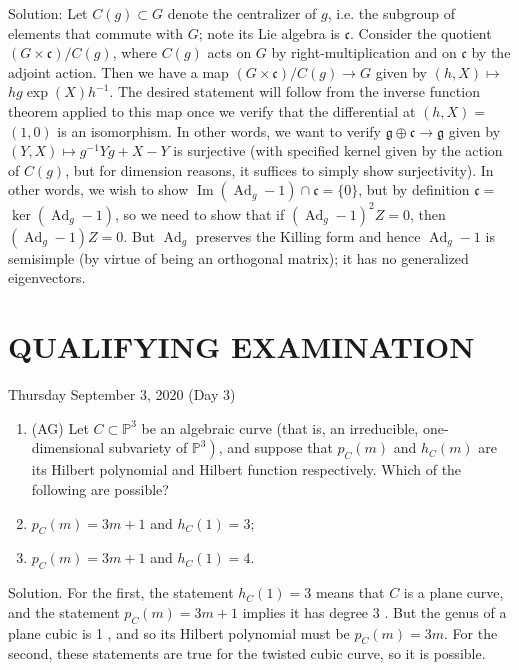 \documentclass[10pt]{article}
\begin{document}
Solution: Let $C(g) \subset G$ denote the centralizer of $g$, i.e. the subgroup of elements that commute with $G$; note its Lie algebra is $\mathfrak{c}$. Consider the quotient $(G \times \mathfrak{c}) / C(g)$, where $C(g)$ acts on $G$ by right-multiplication and on $\mathfrak{c}$ by the adjoint action. Then we have a map $(G \times \mathfrak{c}) / C(g) \rightarrow G$ given by $(h, X) \mapsto$ $h g \exp (X) h^{-1}$. The desired statement will follow from the inverse function theorem applied to this map once we verify that the differential at $(h, X)=$ $(1,0)$ is an isomorphism. In other words, we want to verify $\mathfrak{g} \oplus \mathfrak{c} \rightarrow \mathfrak{g}$ given by $(Y, X) \mapsto g^{-1} Y g+X-Y$ is surjective (with specified kernel given by the action of $C(g)$, but for dimension reasons, it suffices to simply show surjectivity). In other words, we wish to show $\operatorname{Im}\left(\operatorname{Ad}_{g}-1\right) \cap \mathfrak{c}=\{0\}$, but by definition $\mathfrak{c}=$ $\operatorname{ker}\left(\operatorname{Ad}_{g}-1\right)$, so we need to show that if $\left(\operatorname{Ad}_{g}-1\right)^{2} Z=0$, then $\left(\operatorname{Ad}_{g}-1\right) Z=0$. But $\operatorname{Ad}_{g}$ preserves the Killing form and hence $\operatorname{Ad}_{g}-1$ is semisimple (by virtue of being an orthogonal matrix); it has no generalized eigenvectors.

\section*{QUALIFYING EXAMINATION }
Thursday September 3, 2020 (Day 3)

\begin{enumerate}
  \item (AG) Let $C \subset \mathbb{P}^{3}$ be an algebraic curve (that is, an irreducible, one-dimensional subvariety of $\left.\mathbb{P}^{3}\right)$, and suppose that $p_{C}(m)$ and $h_{C}(m)$ are its Hilbert polynomial and Hilbert function respectively. Which of the following are possible?

  \item $p_{C}(m)=3 m+1$ and $h_{C}(1)=3$;

  \item $p_{C}(m)=3 m+1$ and $h_{C}(1)=4$.

\end{enumerate}

Solution. For the first, the statement $h_{C}(1)=3$ means that $C$ is a plane curve, and the statement $p_{C}(m)=3 m+1$ implies it has degree 3 . But the genus of a plane cubic is 1 , and so its Hilbert polynomial must be $p_{C}(m)=3 m$. For the second, these statements are true for the twisted cubic curve, so it is possible.
\end{document}

